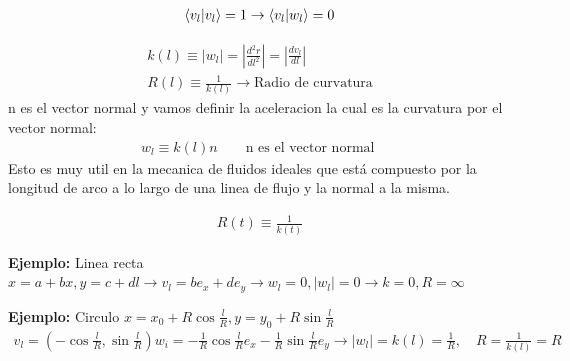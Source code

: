 \documentclass{article}
\newcommand{\caja}[3]{%
  \begin{tcolorbox}[colback=#1!5!white,colframe=#1!25!black,title=#2]
    #3
  \end{tcolorbox}%
}
\begin{document}
\begin{gather}
   \bra{v_l } \ket{v_l } = 1 \rightarrow \bra{v_l }\ket{w_l } = 0    
\end{gather}
\caja{green}{curvatura }{
  \begin{gather}
    k(l) \equiv |w_l | = |\frac{d ^2 r  }{d l^2 }| = | \frac{d v_l  }{d l }|\\
    R(l)  \equiv \frac{1}{k(l) } \rightarrow \text{Radio de curvatura}   
    \label{eq:curvatura }
  \end{gather}
  n es el vector normal y vamos definir la aceleracion la cual es la curvatura por el vector normal: 
  \begin{gather}
    w_l \equiv k(l)n \qquad \text{n es el vector normal } 
    \label{eq:aceleracion }
  \end{gather}
  Esto es muy util en la mecanica de fluidos ideales que está compuesto por la longitud de arco a lo largo de una linea de flujo y la normal a la misma. 
}
\caja{red}{Radio de curvatura }{
  \begin{gather}
    R(t) \equiv \frac{1}{k(t)}
    \label{eq:radio_curvatura }
  \end{gather}
}

\textbf{Ejemplo: } Linea recta $ x = a+bx, y = c+dl  \rightarrow v_l = be_x + de_y  \rightarrow w_l = 0, |w_l| = 0 \rightarrow k = 0, R = \infty  $

\textbf{Ejemplo: } Circulo $ x = x_0 +R \cos{\frac{l}{R} } , y = y_0 + R \sin{\frac{l}{R} }   $
\begin{gather}
  v_l = (-\cos{\frac{l}{R} }, \sin{\frac{l}{R} }    ) 
  w_i = -\frac{1}{R}\cos{\frac{l}{R} }e_x - \frac{1}{R}\sin{\frac{l}{R} }e_y \rightarrow |w_l| = k(l) = \frac{1}{R},\quad R = \frac{1}{k(l)} = R        
  \label{eq:curvatura_circulo }
\end{gather}
\end{document}
